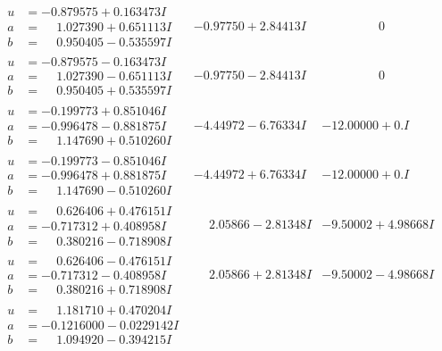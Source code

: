 \documentclass[1p]{elsarticle_modified}
\theoremstyle{definition}
\begin{document}
$$\begin{array}{c|c|c}
\begin{aligned}
u &= -0.879575 + 0.163473 I \\
a &= \phantom{-}1.027390 + 0.651113 I \\
b &= \phantom{-}0.950405 - 0.535597 I\end{aligned}
 & -0.97750 + 2.84413 I & \phantom{-0.000000 } 0 \\ \hline\begin{aligned}
u &= -0.879575 - 0.163473 I \\
a &= \phantom{-}1.027390 - 0.651113 I \\
b &= \phantom{-}0.950405 + 0.535597 I\end{aligned}
 & -0.97750 - 2.84413 I & \phantom{-0.000000 } 0 \\ \hline\begin{aligned}
u &= -0.199773 + 0.851046 I \\
a &= -0.996478 - 0.881875 I \\
b &= \phantom{-}1.147690 + 0.510260 I\end{aligned}
 & -4.44972 - 6.76334 I & -12.00000 + 0. I\phantom{ +0.000000I} \\ \hline\begin{aligned}
u &= -0.199773 - 0.851046 I \\
a &= -0.996478 + 0.881875 I \\
b &= \phantom{-}1.147690 - 0.510260 I\end{aligned}
 & -4.44972 + 6.76334 I & -12.00000 + 0. I\phantom{ +0.000000I} \\ \hline\begin{aligned}
u &= \phantom{-}0.626406 + 0.476151 I \\
a &= -0.717312 + 0.408958 I \\
b &= \phantom{-}0.380216 - 0.718908 I\end{aligned}
 & \phantom{-}2.05866 - 2.81348 I & -9.50002 + 4.98668 I \\ \hline\begin{aligned}
u &= \phantom{-}0.626406 - 0.476151 I \\
a &= -0.717312 - 0.408958 I \\
b &= \phantom{-}0.380216 + 0.718908 I\end{aligned}
 & \phantom{-}2.05866 + 2.81348 I & -9.50002 - 4.98668 I \\ \hline\begin{aligned}
u &= \phantom{-}1.181710 + 0.470204 I \\
a &= -0.1216000 - 0.0229142 I \\
b &= \phantom{-}1.094920 - 0.394215 I\end{aligned}

\end{array}$$
\end{document}
